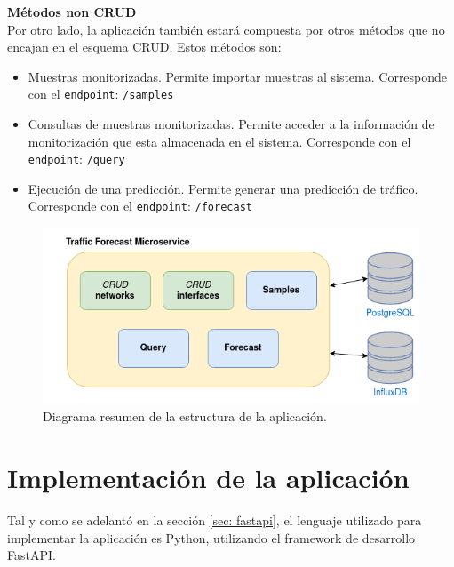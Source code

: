 \documentclass[a4paper, oneside, 12pt]{book}
\begin{document}
	\pagebreak

	\noindent \textbf{\large Métodos non CRUD} \\
	
	\noindent Por otro lado, la aplicación también estará compuesta por otros métodos que no encajan en el esquema CRUD. Estos métodos son:
	
	\begin{itemize}
		\item Muestras monitorizadas. Permite importar muestras al sistema. Corresponde con el \texttt{endpoint}: \texttt{/samples}
		\item Consultas de muestras monitorizadas. Permite acceder a la información de monitorización que esta almacenada en el sistema. Corresponde con el \texttt{endpoint}: \texttt{/query}
		\item Ejecución de una predicción. Permite generar una predicción de tráfico. Corresponde con el \texttt{endpoint}: \texttt{/forecast}
	\end{itemize}
	
	\begin{figure}[h!]
		\begin{center}
			\includegraphics[width=1\textwidth]{diag/traffic_forecast_schema.png}
			\caption{Diagrama resumen de la estructura de la aplicación.}
		\end{center}
	\end{figure}

	\pagebreak
	
	\section{Implementación de la aplicación}
	
	\noindent Tal y como se adelantó en la sección \ref{sec: fastapi}, el lenguaje utilizado para implementar la aplicación es Python, utilizando el framework de desarrollo FastAPI. \\
	
\end{document}

